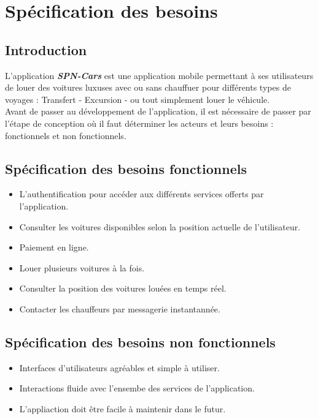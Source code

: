 \section{Spécification des besoins}
\subsection{Introduction}
L'application \textit{\textbf{SPN-Cars}} est une application mobile permettant à ses utilisateurs de louer des voitures luxuses avec ou sans chauffuer pour différents types de voyages : Transfert - Excursion - ou tout simplement louer le véhicule.\\
\noindent Avant de passer au développement de l'application, il est nécessaire de passer par l'étape de conception où il faut déterminer les acteurs et leurs besoins : fonctionnels et non fonctionnels.
\subsection{Spécification des besoins fonctionnels}
\begin{itemize}
    \item L'authentification pour accéder aux différents services offerts par l'application.
    \item Consulter les voitures disponibles selon la position actuelle de l'utilisateur.
    \item Paiement en ligne.
    \item Louer plusieurs voitures à la fois.
    \item Consulter la position des voitures louées en temps réel.
    \item Contacter les chauffeurs par messagerie instantannée.
\end{itemize}
\subsection{Spécification des besoins non fonctionnels}
\begin{itemize}
    \item Interfaces d'utilisateurs agréables et simple à utiliser.
    \item Interactions fluide avec l'ensembe des services de l'application.
    \item L'appliaction doit être facile à maintenir dans le futur.
\end{itemize}


